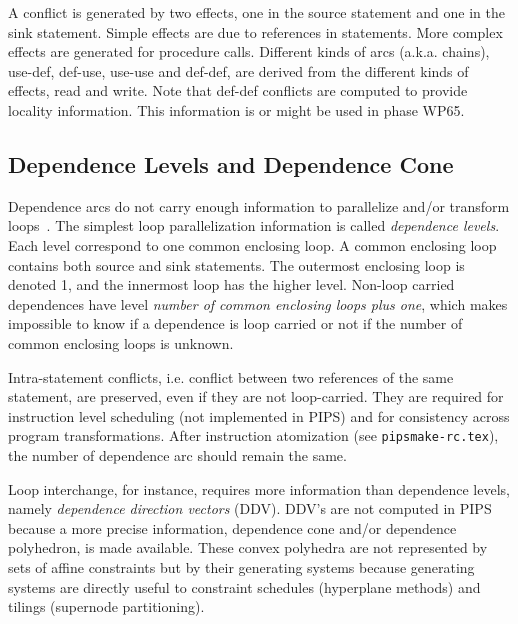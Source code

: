 \documentclass[a4paper]{article}
\begin{document}
A conflict is generated by two effects, one in the source statement and
one in the sink statement. Simple effects are due to references in
statements. More complex effects are generated for procedure
calls. Different kinds of arcs (a.k.a. chains), use-def, def-use,
use-use and def-def, are derived from the different kinds of effects,
read and write. Note that def-def conflicts are computed to provide
locality information. This information is or might be used in phase WP65.

\begin{comment}
Un conflit existe entre deux effets pre'sents dans deux noeuds voisins
du graphe de de'pendance. Les types d'effet (write, read) sert a`
distinguer les conflits ``use-def'', ``def-def'' et ``{def-use}''. Le
cone comprend les informations precises de conflict.
\end{comment}

\subsection{Dependence Levels and Dependence Cone}

{}

Dependence arcs do not carry enough information to parallelize and/or
transform loops~\cite{YAI95}. The simplest loop parallelization
information is called {\em dependence levels}. Each level correspond to
one common enclosing loop. A common enclosing loop contains both source
and sink statements. The outermost enclosing loop is denoted 1, and the
innermost loop has the higher level. Non-loop carried dependences have
level {\em number of common enclosing loops plus one}, which makes
impossible to know if a dependence is loop carried or not if the number of
common enclosing loops is unknown.

Intra-statement conflicts, i.e. conflict between two references of the
same statement, are preserved, even if they are not loop-carried. They
are required for instruction level scheduling (not implemented in PIPS)
and for consistency across program transformations. After instruction
atomization (see \verb/pipsmake-rc.tex/), the number of dependence arc
should remain the same.

Loop interchange, for instance, requires more information than
dependence levels, namely {\em dependence direction vectors}
(DDV). DDV's are not computed in PIPS because a more precise
information, dependence cone and/or dependence polyhedron, is made
available. These convex polyhedra are not represented by sets of affine
constraints but by their generating systems because generating systems
are directly useful to constraint schedules (hyperplane methods) and
tilings (supernode partitioning).
\end{document}
